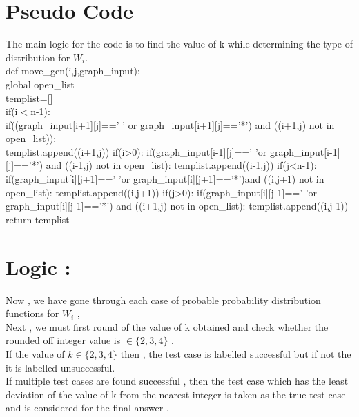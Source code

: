 \documentclass{article}
\begin{document}
\section{Pseudo Code}
The main logic for the code is to find the value of k while determining the type of distribution for $W_i$.
\vspace{5pt}
\\
def move\_gen(i,j,graph\_input):
\vspace{5pt}
    \\ \hspace*{10pt}global open\_list
    \vspace{2pt}
    \\ \hspace*{10pt}templist=[]
    \vspace{2pt}
    \\ \hspace*{10pt}if(i$<$n-1):
    \vspace{2pt}
    \\ \hspace*{20pt}    if((graph\_input[i+1][j]==' ' or graph\_input[i+1][j]=='*') and ((i+1,j) not in open\_list)):
    \vspace{2pt}
    \\ \hspace*{30pt}        templist.append((i+1,j))
    if(i>0):
        if(graph\_input[i-1][j]==' 'or graph\_input[i-1][j]=='*') and ((i-1,j) not in open\_list):
            templist.append((i-1,j))
    if(j<n-1):
        if(graph\_input[i][j+1]==' 'or graph\_input[i][j+1]=='*')and ((i,j+1) not in open\_list):
            templist.append((i,j+1))
    if(j>0):
        if(graph\_input[i][j-1]==' 'or graph\_input[i][j-1]=='*') and ((i+1,j) not in open\_list):
            templist.append((i,j-1))
    return templist
\section*{Logic :}
Now , we have gone through each case of probable probability distribution functions for $W_i$ ,
\vspace{5pt}
\\Next , we must first round of the value of k obtained and check whether the rounded off integer value is $\in \{2,3,4\}$ . 
\vspace{5pt}
\\If the value of $ k\in \{2,3,4\}$ then , the test case is labelled {\color{green}successful} but if not the it is labelled {\color{red}unsuccessful}.
\vspace{5pt}
\\If multiple test cases are found successful , then the test case which has the least deviation of the value of k from the nearest integer is taken as the true test case
and is considered for the final answer .
\newpage
\end{document}
